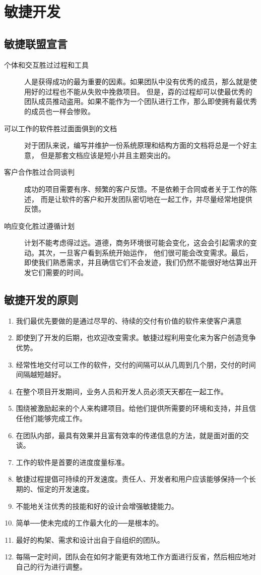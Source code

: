 \documentclass[11pt]{article}
\author{channing}
\date{\today}
\title{}
\begin{document}
\tableofcontents

\section{敏捷开发}
\label{sec:org9ae2bea}
\subsection{敏捷联盟宣言}
\label{sec:org2c71d19}
\begin{description}
\item[{个体和交互胜过过程和工具}] 人是获得成功的最为重要的因素。如果团队中没有优秀的成员，那么就是使用好的过程也不能从失败中挽救项目。
但是，孬的过程却可以使最优秀的团队成员推动盗用。如果不能作为一个团队进行工作，那么即使拥有最优秀的成员也一样会惨败。
\item[{可以工作的软件胜过面面俱到的文档}] 对于团队来说，编写并维护一份系统原理和结构方面的文档将总是一个好主意，
但是那套文档应该是短小并且主题突出的。
\item[{客户合作胜过合同谈判}] 成功的项目需要有序、频繁的客户反馈。不是依赖于合同或者关于工作的陈述，
而是让软件的客户和开发团队密切地在一起工作，并尽量经常地提供反馈。
\item[{响应变化胜过遵循计划}] 计划不能考虑得过远。道德，商务环境很可能会变化，这会会引起需求的变动。其次，一旦客户看到系统开始运作，
他们很可能会改变需求。最后，即使我们熟悉需求，并且确信它们不会发迹，我们仍然不能很好地估算出开发它们需要的时间。
\end{description}
\subsection{敏捷开发的原则}
\label{sec:org7816e8f}
\begin{enumerate}
\item 我们最优先要做的是通过尽早的、待续的交付有价值的软件来使客户满意
\item 即使到了开发的后期，也欢迎改变需求。敏捷过程利用变化来为客户创造竞争优势。
\item 经常性地交付可以工作的软件，交付的间隔可以从几周到几个朋，交付的时间间隔越短越好。
\item 在整个项目开发期间，业务人员和开发人员必须天天都在一起工作。
\item 围绕被激励起来的个人来构建项目。给他们提供所需要的环境和支持，并且信任他们能够完成工作。
\item 在团队内部，最具有效果并且富有效率的传递信息的方法，就是面对面的交谈。
\item 工作的软件是首要的进度度量标准。
\item 敏捷过程提倡可持续的开发速度。责任人、开发者和用户应该能够保持一个长期的、恒定的开发速度。
\item 不能地关注优秀的技能和好的设计会增强敏捷能力。
\item 简单──使未完成的工作最大化的──是根本的。
\item 最好的构架、需求和设计出自于自组织的团队。
\item 每隔一定时间，团队会在如何才能更有效地工作方面进行反省，然后相应地对自己的行为进行调整。
\end{enumerate}
\end{document}
